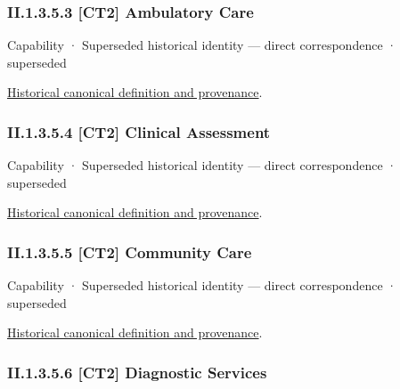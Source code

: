 \subsubsection*{II.1.3.5.3 [CT2] Ambulatory Care}
\label{navigation:II.1.3.5.3}

\label{element:e996b61b6e7b4619913f427aed2b55b1}
{\small Capability · Superseded historical identity — direct correspondence · superseded}\par
\href{../../../../continuum/strategy/capability/e996b61b6e7b4619913f427aed2b55b1.md}{Historical canonical definition and provenance}.\par
\subsubsection*{II.1.3.5.4 [CT2] Clinical Assessment}
\label{navigation:II.1.3.5.4}

\label{element:1c3b553c87704e27ba211fbbd02d95cb}
{\small Capability · Superseded historical identity — direct correspondence · superseded}\par
\href{../../../../continuum/strategy/capability/1c3b553c87704e27ba211fbbd02d95cb.md}{Historical canonical definition and provenance}.\par
\subsubsection*{II.1.3.5.5 [CT2] Community Care}
\label{navigation:II.1.3.5.5}

\label{element:4b7177f3f40449518fba381acae6ba1e}
{\small Capability · Superseded historical identity — direct correspondence · superseded}\par
\href{../../../../continuum/strategy/capability/4b7177f3f40449518fba381acae6ba1e.md}{Historical canonical definition and provenance}.\par
\subsubsection*{II.1.3.5.6 [CT2] Diagnostic Services}
\label{navigation:II.1.3.5.6}

